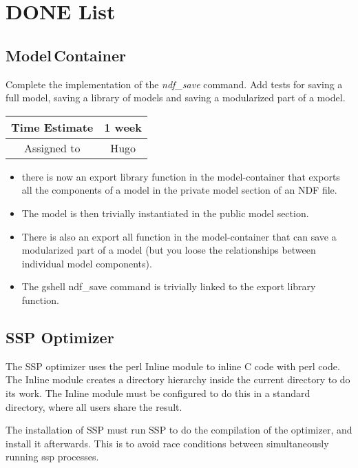\documentclass[12pt]{article}
\begin{document}
\section{DONE List}


\subsection{Model\,Container}
Complete the implementation of the {\it ndf\_save} command.  Add tests for
saving a full model, saving a library of models and saving a
modularized part of a model.

\begin{center}
  \vspace{5mm}
  \centering
  \begin{tabular}{|c|c|}
    \hline
    Time Estimate
    & 1 week \\
    \hline
    Assigned to
    & Hugo \\
    \hline
  \end{tabular}
\end{center}

\begin{itemize}
\item there is now an export library function in the model-container
  that exports all the components of a model in the private model
  section of an NDF file.
\item The model is then trivially instantiated in the public model
  section.
\item There is also an export all function in the model-container that
  can save a modularized part of a model (but you loose the
  relationships between individual model components).
\item The gshell ndf\_save command is trivially linked to the export
  library function.
\end{itemize}


\subsection{SSP Optimizer}

The SSP optimizer uses the perl Inline module to inline C code with
perl code.  The Inline module creates a directory hierarchy inside the
current directory to do its work.  The Inline module must be
configured to do this in a standard directory, where all users share
the result.

The installation of SSP must run SSP to do the compilation of the
optimizer, and install it afterwards.  This is to avoid race
conditions between simultaneously running ssp processes.
\end{document}
